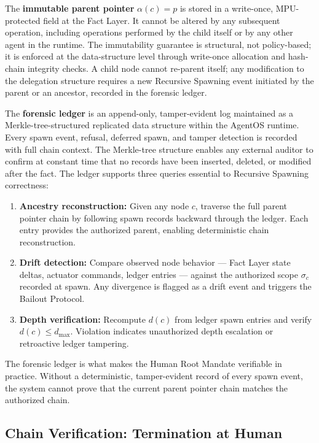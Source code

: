 The \textbf{immutable parent pointer} $\alpha(c) = p$ is stored in a write-once, MPU-protected field at the Fact Layer. It cannot be altered by any subsequent operation, including operations performed by the child itself or by any other agent in the runtime. The immutability guarantee is structural, not policy-based; it is enforced at the data-structure level through write-once allocation and hash-chain integrity checks. A child node cannot re-parent itself; any modification to the delegation structure requires a new Recursive Spawning event initiated by the parent or an ancestor, recorded in the forensic ledger.

The \textbf{forensic ledger} is an append-only, tamper-evident log maintained as a Merkle-tree-structured replicated data structure within the AgentOS runtime. Every spawn event, refusal, deferred spawn, and tamper detection is recorded with full chain context. The Merkle-tree structure enables any external auditor to confirm at constant time that no records have been inserted, deleted, or modified after the fact. The ledger supports three queries essential to Recursive Spawning correctness:

\begin{enumerate}
    \itemsep0em
    \item \textbf{Ancestry reconstruction:} Given any node $c$, traverse the full parent pointer chain by following spawn records backward through the ledger. Each entry provides the authorized parent, enabling deterministic chain reconstruction.
    \item \textbf{Drift detection:} Compare observed node behavior — Fact Layer state deltas, actuator commands, ledger entries — against the authorized scope $\sigma_c$ recorded at spawn. Any divergence is flagged as a drift event and triggers the Bailout Protocol.
    \item \textbf{Depth verification:} Recompute $d(c)$ from ledger spawn entries and verify $d(c) \leq d_{\max}$. Violation indicates unauthorized depth escalation or retroactive ledger tampering.
\end{enumerate}

The forensic ledger is what makes the Human Root Mandate verifiable in practice. Without a deterministic, tamper-evident record of every spawn event, the system cannot prove that the current parent pointer chain matches the authorized chain.

\subsection{Chain Verification: Termination at Human}
\label{sec:chain-verification}

